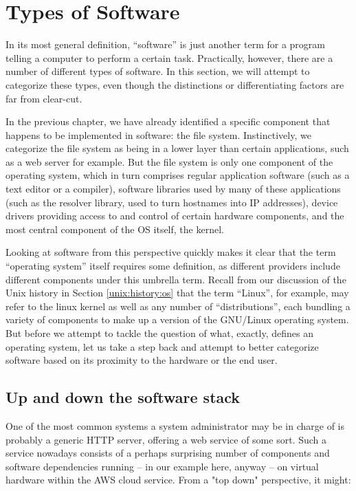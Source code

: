 \section{Types of Software}
\label{software-installation:types}

In its most general definition, ``software'' is just
another term for a program telling a computer to
perform a certain task.  Practically, however, there
are a number of different types of software.  In this
section, we will attempt to categorize these types,
even though the distinctions or differentiating
factors are far from clear-cut.

In the previous chapter, we have already identified a
specific component that happens to be implemented in
software: the file system.  Instinctively, we
categorize the file system as being in a lower layer
than certain applications, such as a web server for
example.  But the file system is only one component of
the operating system, which in turn comprises regular
application software (such as a text editor or a
compiler), software libraries used by many of these
applications (such as the resolver library, used to
turn hostnames into IP addresses), device
drivers providing access to and
control of certain hardware components, and the most
central component of the OS itself, the
kernel.

Looking at software from this perspective quickly
makes it clear that the term ``operating system''
itself requires some definition, as different
providers include different components under this
umbrella term.  Recall from our discussion of the Unix
history in Section \ref{unix:history:os} that the term
``Linux'', for example, may refer to the linux
kernel as well as any number of ``distributions'',
each bundling a variety of components to make up a
version of the GNU/Linux operating system.  But before
we attempt to tackle the question of what, exactly,
defines an operating system, let us take a step back
and attempt to better categorize software based on its
proximity to the hardware or the end user.

\subsection{Up and down the software stack}
\label{software-installation:boot-sequence}

One of the most common systems a system administrator
may be in charge of is probably a generic
HTTP server, offering a web service of
some sort.  Such a service nowadays consists of a
perhaps surprising number of components and software
dependencies running -- in our example here, anyway --
on virtual hardware within the AWS cloud service.
From a "top down" perspective, it might:

